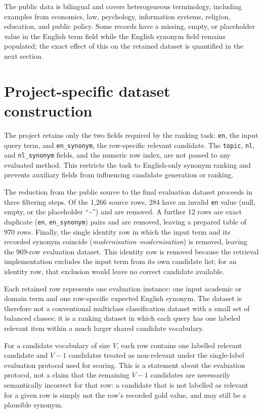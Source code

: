 The public data is bilingual and covers heterogeneous terminology, including examples from economics, law, psychology, information systems, religion, education, and public policy. Some records have a missing, empty, or placeholder value in the English term field while the English synonym field remains populated; the exact effect of this on the retained dataset is quantified in the next section.

\section{Project-specific dataset construction}

The project retains only the two fields required by the ranking task: \texttt{en}, the input query term, and \texttt{en\_synonym}, the row-specific relevant candidate. The \texttt{topic}, \texttt{nl}, and \texttt{nl\_synonym} fields, and the numeric row index, are not passed to any evaluated method. This restricts the task to English-only synonym ranking and prevents auxiliary fields from influencing candidate generation or ranking.

The reduction from the public source to the final evaluation dataset proceeds in three filtering steps. Of the 1,266 source rows, 284 have an invalid \texttt{en} value (null, empty, or the placeholder ``\texttt{-}'') and are removed. A further 12 rows are exact duplicate (\texttt{en}, \texttt{en\_synonym}) pairs and are removed, leaving a prepared table of 970 rows. Finally, the single identity row in which the input term and its recorded synonym coincide (\emph{modernisation}--\emph{modernisation}) is removed, leaving the 969-row evaluation dataset. This identity row is removed because the retrieval implementation excludes the input term from its own candidate list; for an identity row, that exclusion would leave no correct candidate available.

Each retained row represents one evaluation instance: one input academic or domain term and one row-specific expected English synonym. The dataset is therefore not a conventional multiclass classification dataset with a small set of balanced classes; it is a ranking dataset in which each query has one labeled relevant item within a much larger shared candidate vocabulary.

For a candidate vocabulary of size $V$, each row contains one labelled relevant candidate and $V-1$ candidates treated as non-relevant under the single-label evaluation protocol used for scoring. This is a statement about the evaluation protocol, not a claim that the remaining $V-1$ candidates are necessarily semantically incorrect for that row: a candidate that is not labelled as relevant for a given row is simply not the row's recorded gold value, and may still be a plausible synonym.

